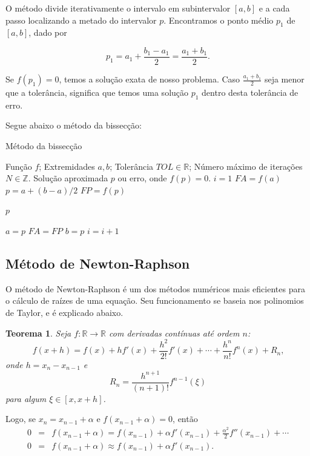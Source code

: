 \documentclass[a4paper, 10pt]{article} %
\newcommand{\R}{\mathbb{R}}
\newcommand{\Z}{\mathbb{Z}}
\newtheorem{teo}{Teorema}[section]
\theoremstyle{definition}
\theoremstyle{definition}
\numberwithin{equation}{section} %
\numberwithin{lstlisting}{section}
\numberwithin{algorithm}{section}
\numberwithin{table}{section}
\begin{document}
O método divide iterativamente o intervalo em subintervalor $[a,b]$ e a cada passo localizando a metado do intervalor $p$. Encontramos o ponto médio $p_1$ de $[a,b]$, dado por

\[p_1 = a_1 + \frac{b_1 - a_1}{2} = \frac{a_1 + b_1}{2}.\]

Se $f(p_1) = 0$, temos a solução exata de nosso problema. Caso $\frac{a_1 + b_1}{2}$ seja menor que a tolerância, significa que temos uma solução $p_1$ dentro desta tolerância de erro.

Segue abaixo o método da bissecção:

\begin{algorithm}[H]
  \caption{Método da bissecção} \label{algoritmo:bisseccao}
  \begin{algorithmic}[1]
   \Require Função $f$; Extremidades $a, b$; Tolerância $TOL \in \R$; Número máximo de iterações $N \in \Z$.
   \Ensure Solução aproximada $p$ ou erro, onde $f(p) = 0$.
    \State $i=1$
    \State $FA = f(a)$
      \State $p = a + (b-a)/2$
      \State $FP = f(p)$
      
	\State \Return $p$
      \EndIf
      
	\State $a = p$
	\State $FA = FP$
      \Else
	\State $b = p$
      \EndIf
      \State $i = i+1$
    \EndWhile
    \State {}
   \EndFunction
  \end{algorithmic}
 \end{algorithm}

\subsection{Método de Newton-Raphson}

O método de Newton-Raphson é um dos métodos numéricos mais eficientes para o cálculo de raízes de uma equação. Seu funcionamento se baseia nos polinomios de Taylor, e é explicado abaixo.

\begin{teo}
Seja $f: \R \rightarrow \R$ com derivadas contínuas até ordem $n$: \[f(x+h) = f(x) + hf'(x) + \frac{h^2}{2!}f'(x) + \cdots + \frac{h^n}{n!}f^n(x) + R_n\text{,}\] onde $h = x_n - x_{n-1}$ e \[R_n = \frac{h^{n+1}}{(n+1)!}f^{n-1}(\xi)\] para algum $\xi \in [x, x+h]$.
\end{teo}

Logo, se $x_{n} = x_{n-1} + \alpha$ e $f(x_{n-1} + \alpha) = 0$, então
\begin{eqnarray*}
	0 & = & f(x_{n-1} + \alpha) = f(x_{n-1}) + \alpha f'(x_{n-1}) + \frac{\alpha^2}{2}f''(x_{n-1}) + \cdots\\
	0 & = & f(x_{n-1} + \alpha) \approx f(x_{n-1}) + \alpha f'(x_{n-1})\text{.}
\end{eqnarray*}
\end{document}
